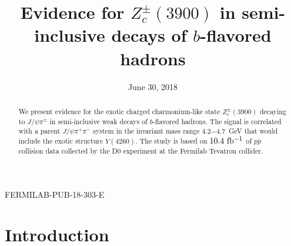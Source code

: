 \documentclass[aps,prd,twocolumn,superscriptaddress,groupedaddress,floatfix]{revtex4}
\begin{document}


\hspace{4.8in} \mbox{FERMILAB-PUB-18-303-E }





\title{Evidence for  {\boldmath  $Z_c^{\pm}(3900)$} in semi-inclusive decays
of {\boldmath  $b$}-flavored  hadrons}




\date{June 30, 2018}

\begin{abstract}
We present evidence for the exotic charged charmonium-like state
 $Z_c^{\pm}(3900)$ decaying to $J/\psi \pi^{\pm}$
in semi-inclusive weak decays of $b$-flavored hadrons. 
The signal is correlated with a  parent $J/\psi \pi^+ \pi^-$ system
in the invariant mass range 4.2$-$4.7~GeV that would  include   the exotic
structure $Y(4260)$.
The study is based on  $10.4~\rm{fb^{-1}}$ of $p \overline p $ collision
data  collected by the  D0 experiment at  the Fermilab Tevatron collider.
\end{abstract}

\maketitle




\section{Introduction}
\end{document}
